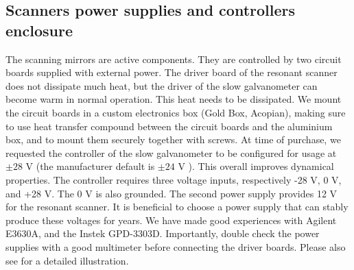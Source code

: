 \documentclass[10pt,letterpaper]{article}
\begin{document}
\subsection*{Scanners power supplies and controllers enclosure}
The scanning mirrors are active components. They are controlled by two circuit boards supplied with external power. The driver board of the resonant scanner does not dissipate much heat, but the driver of the slow galvanometer can become warm in normal operation. This heat needs to be dissipated. We mount the circuit boards in a custom electronics box (Gold Box, Acopian), making sure to use heat transfer compound between the circuit boards and the aluminium box, and to mount them securely together with screws. At time of purchase, we requested the controller of the slow galvanometer to be configured for usage at $\pm 28\text{ V}$ (the manufacturer default is $\pm 24\text{ V}$ ). This overall improves dynamical properties. The controller requires three voltage inputs, respectively -28 V, 0 V, and +28 V. The 0 V is also grounded. The second power supply provides 12 V for the resonant scanner. It is beneficial to choose a power supply that can stably produce these voltages for years. We have made good experiences with Agilent E3630A, and the Instek GPD-3303D. Importantly, double check the power supplies with a good multimeter before connecting the driver boards. Please also see  for a detailed illustration.
\end{document}
